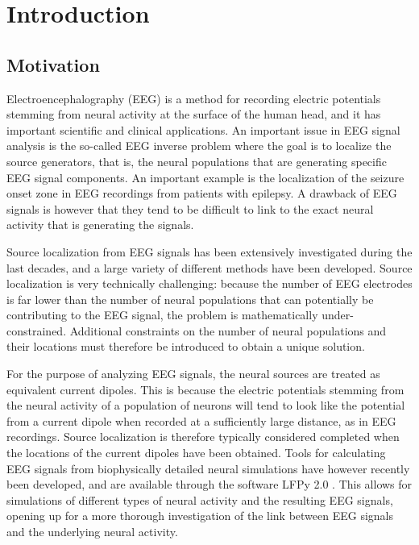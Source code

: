 \documentclass[a4paper, UKenglish, 11pt]{uiomaster}
\begin{document}
\chapter{Introduction}

\section{Motivation}

Electroencephalography (EEG) is a method for recording electric potentials stemming from neural activity at the surface of the human head, and it has important scientific and clinical applications. An important issue in EEG signal analysis is the so-called EEG inverse problem where the goal is to localize the source generators, that is, the neural populations that are generating specific EEG signal components. An important example is the localization of the seizure onset zone in EEG recordings from patients with epilepsy. A drawback of EEG signals is however that they tend to be difficult to link to the exact neural activity that is generating the signals.

Source localization from EEG signals has been extensively investigated during the last decades, and a large variety of different methods have been developed. Source localization is very technically challenging: because the number of EEG electrodes is far lower than the number of neural populations that can potentially be contributing to the EEG signal, the problem is mathematically under-constrained. Additional constraints on the number of neural populations and their locations must therefore be introduced to obtain a unique solution.

For the purpose of analyzing EEG signals, the neural sources are treated as equivalent current dipoles. This is because the electric potentials stemming from the neural activity of a population of neurons will tend to look like the potential from a current dipole when recorded at a sufficiently large distance, as in EEG recordings. Source localization is therefore typically considered completed when the locations of the current dipoles have been obtained. Tools for calculating EEG signals from biophysically detailed neural simulations have however recently been developed, and are available through the software LFPy 2.0 \cite{LFPy}. This allows for simulations of different types of neural activity and the resulting EEG signals, opening up for a more thorough investigation of the link between EEG signals and the underlying neural activity.
\end{document}
